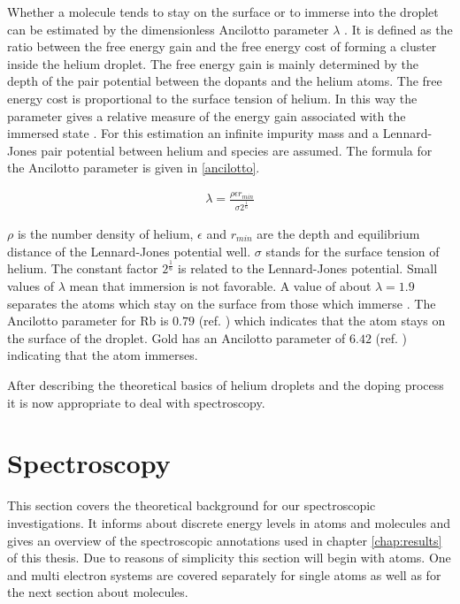 \documentclass[parskip,12pt,headsepline,a4paper] {scrbook}
\begin{document}
Whether a molecule tends to stay on the surface or to immerse into the droplet can be estimated by the dimensionless Ancilotto parameter $\lambda$ \cite{ancil-param}. It is defined as the ratio between the free energy gain and the free energy cost of forming a cluster inside the helium droplet. The free energy gain is mainly determined by the depth of the pair potential between the dopants and the helium atoms. The free energy cost is proportional to the surface tension of helium. In this way the parameter gives a relative measure of the energy gain associated with the immersed state \cite{ancil-param}. For this estimation an infinite impurity mass and a Lennard-Jones pair potential between helium and species are assumed. The formula for the Ancilotto parameter is given in \ref{ancilotto}.

\begin{align}  \label{ancilotto}
\lambda = \frac{\rho \epsilon r_{min}}{\sigma 2^{\frac{1}{6}}}
\end{align}

$\rho$ is the number density of helium, $\epsilon$ and $r_{min}$ are the depth and equilibrium distance of the Lennard-Jones potential well. $\sigma$ stands for the surface tension of helium. The constant factor $2^{\frac{1}{6}}$ is related to the Lennard-Jones potential.
Small values of $\lambda$ mean that immersion is not favorable. A value of about $\lambda = 1.9$ separates the atoms which stay on the surface from those which immerse \cite{acil-param-value}. The Ancilotto parameter for Rb is $0.79$ (ref. \cite{ancil-param}) which indicates that the atom stays on the surface of the droplet. Gold has an Ancilotto parameter of $6.42$ (ref. \cite{tong}) indicating that the atom immerses.

After describing the theoretical basics of helium droplets and the doping process it is now appropriate to deal with spectroscopy.

\section{Spectroscopy}
\vspace{-0.5\baselineskip}
This section covers the theoretical background for our spectroscopic investigations. It informs about discrete energy levels in atoms and molecules and gives an overview of the spectroscopic annotations used in chapter \ref{chap:results} of this thesis. Due to reasons of simplicity this section will begin with atoms. One and multi electron systems are covered separately for single atoms as well as for the next section about molecules.
\end{document}
